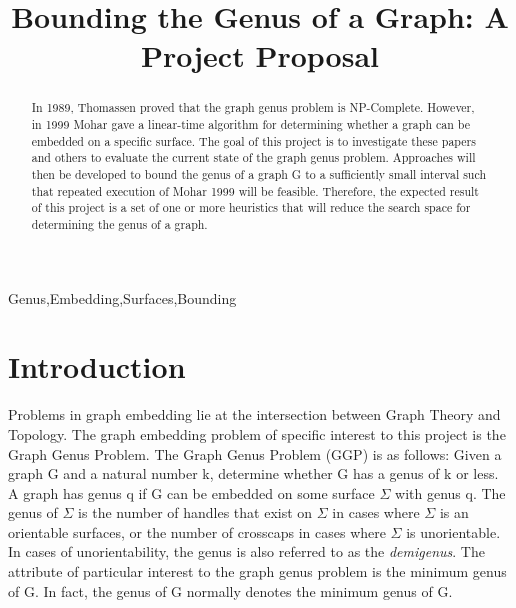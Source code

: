 \documentclass[12pt,conference]{IEEEtran}
\begin{document}
\raggedbottom

\title{Bounding the Genus of a Graph: A Project Proposal}

\author{
}

\maketitle

\begin{abstract}

In 1989, Thomassen proved that the graph genus problem is NP-Complete. However, in 1999 Mohar gave a linear-time algorithm for determining whether a graph can be embedded on a specific surface. The goal of this project is to investigate these papers and others to evaluate the current state of the graph genus problem. Approaches will then be developed to bound the genus of a graph G to a sufficiently small interval such that repeated execution of Mohar 1999 will be feasible. Therefore, the expected result of this project is a set of one or more heuristics that will reduce the search space for determining the genus of a graph.

\end{abstract}

\begin{IEEEkeywords}
Genus,Embedding,Surfaces,Bounding
\end{IEEEkeywords}

\section{Introduction}

Problems in graph embedding lie at the intersection between Graph Theory and Topology. The graph embedding problem of specific interest to this project is the Graph Genus Problem. The Graph Genus Problem (GGP) is as follows: Given a graph G and a natural number k, determine whether G has a genus of k or less. A graph has genus q if G can be embedded on some surface $\Sigma$ with genus q. The genus of $\Sigma$ is the number of handles that exist on $\Sigma$ in cases where $\Sigma$ is an orientable surfaces, or the number of crosscaps in cases where $\Sigma$ is unorientable. In cases of unorientability, the genus is also referred to as the \textit{demigenus}. The attribute of particular interest to the graph genus problem is the minimum genus of G. In fact, the genus of G normally denotes the minimum genus of G. 
\end{document}
